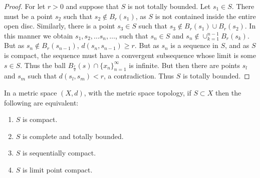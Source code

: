 \documentclass[crop=false,class=book,oneside]{standalone}
\begin{document}
            \begin{proof}
            For let $r>0$ and suppose that $S$ is not totally bounded. Let $s_1\in S$. There must be a point $s_2$ such that $s_2 \notin B_{r}(s_1)$, as $S$ is not contained inside the entire open disc. Similarly, there is a point $s_3\in S$ such that $s_3 \notin B_r(s_1)\cup B_r(s_2)$. In this manner we obtain $s_1, s_2, \hdots s_n, \hdots$, such that $s_n \in S$ and $s_n \notin \cup_{k=1}^{n-1}B_r(s_k)$. But as $s_n \notin B_r(s_{n-1})$, $d(s_n, s_{n-1})\geq r$. But as $s_n$ is a sequence in $S$, and as $S$ is compact, the sequence must have a convergent subsequence whose limit is some $s\in S$. Thus the ball $B_{\frac{r}{2}}(s)\cap \{x_n\}_{n=1}^{\infty}$ is infinite. But then there are points $s_{l}$ and $s_{m}$ such that $d(s_l,s_m)<r$, a contradiction. Thus $S$ is totally bounded.
            \end{proof}
            \begin{theorem}
            In a metric space $(X,d)$, with the metric space topology, if $S\subset X$ then the following are equivalent:
            \begin{enumerate}
            \item $S$ is compact.
            \item $S$ is complete and totally bounded.
            \item $S$ is sequentially compact.
            \item $S$ is limit point compact.
            \end{enumerate}
            \end{theorem}
\end{document}
